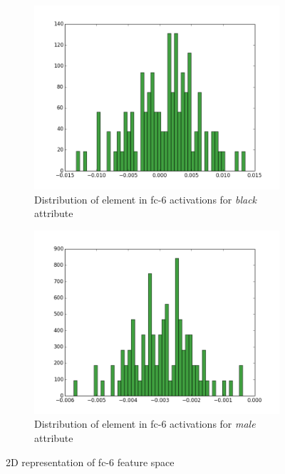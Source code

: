\documentclass[10pt,twocolumn,letterpaper]{article}
\begin{document}

\begin{figure}[h]
    \centering
    \hfill
    \begin{subfigure}[b]{0.49\linewidth}
        \includegraphics[width=\linewidth]{images/gmm_analysis/black-1.png}
        \caption{Distribution of element in fc-6 activations for \textit{black} attribute}
        \label{fig:black-1}
    \end{subfigure}
    \hfill
    \begin{subfigure}[b]{0.49\linewidth}
        \includegraphics[width=\linewidth]{images/gmm_analysis/male-1.png}
        \caption{Distribution of element in fc-6 activations for \textit{male} attribute}
        \label{fig:male-1}
    \end{subfigure}
    \hfill
    \caption{2D representation of fc-6 feature space}
    \label{fig:distributions}
\end{figure}
\end{document}

